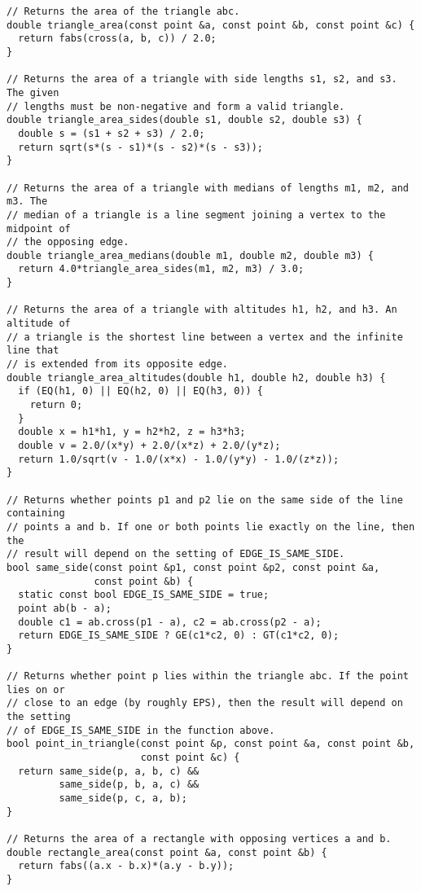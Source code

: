 \begin{lstlisting}
// Returns the area of the triangle abc.
double triangle_area(const point &a, const point &b, const point &c) {
  return fabs(cross(a, b, c)) / 2.0;
}

// Returns the area of a triangle with side lengths s1, s2, and s3. The given
// lengths must be non-negative and form a valid triangle.
double triangle_area_sides(double s1, double s2, double s3) {
  double s = (s1 + s2 + s3) / 2.0;
  return sqrt(s*(s - s1)*(s - s2)*(s - s3));
}

// Returns the area of a triangle with medians of lengths m1, m2, and m3. The
// median of a triangle is a line segment joining a vertex to the midpoint of
// the opposing edge.
double triangle_area_medians(double m1, double m2, double m3) {
  return 4.0*triangle_area_sides(m1, m2, m3) / 3.0;
}

// Returns the area of a triangle with altitudes h1, h2, and h3. An altitude of
// a triangle is the shortest line between a vertex and the infinite line that
// is extended from its opposite edge.
double triangle_area_altitudes(double h1, double h2, double h3) {
  if (EQ(h1, 0) || EQ(h2, 0) || EQ(h3, 0)) {
    return 0;
  }
  double x = h1*h1, y = h2*h2, z = h3*h3;
  double v = 2.0/(x*y) + 2.0/(x*z) + 2.0/(y*z);
  return 1.0/sqrt(v - 1.0/(x*x) - 1.0/(y*y) - 1.0/(z*z));
}

// Returns whether points p1 and p2 lie on the same side of the line containing
// points a and b. If one or both points lie exactly on the line, then the
// result will depend on the setting of EDGE_IS_SAME_SIDE.
bool same_side(const point &p1, const point &p2, const point &a,
               const point &b) {
  static const bool EDGE_IS_SAME_SIDE = true;
  point ab(b - a);
  double c1 = ab.cross(p1 - a), c2 = ab.cross(p2 - a);
  return EDGE_IS_SAME_SIDE ? GE(c1*c2, 0) : GT(c1*c2, 0);
}

// Returns whether point p lies within the triangle abc. If the point lies on or
// close to an edge (by roughly EPS), then the result will depend on the setting
// of EDGE_IS_SAME_SIDE in the function above.
bool point_in_triangle(const point &p, const point &a, const point &b,
                       const point &c) {
  return same_side(p, a, b, c) &&
         same_side(p, b, a, c) &&
         same_side(p, c, a, b);
}

// Returns the area of a rectangle with opposing vertices a and b.
double rectangle_area(const point &a, const point &b) {
  return fabs((a.x - b.x)*(a.y - b.y));
}


\end{lstlisting}
